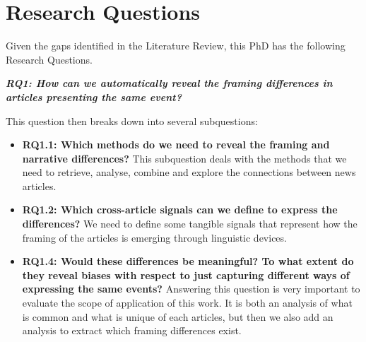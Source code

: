 \chapter{Research Questions}
\label{chap:research_questions}


Given the gaps identified in the Literature Review, this PhD has the following Research Questions.

\vspace{12px}

\textit{\textbf{RQ1: How can we automatically reveal the framing differences in articles presenting the same event?}}

\vspace{12px}

This question then breaks down into several subquestions:

\begin{itemize}
    \item \textbf{RQ1.1: Which methods do we need to reveal the framing and narrative differences?} This subquestion deals with the methods that we need to retrieve, analyse, combine and explore the connections between news articles. %
    
    \item \textbf{RQ1.2: Which cross-article signals can we define to express the differences?} We need to define some tangible signals that represent how the framing of the articles is emerging through linguistic devices. %
    
    
    \item \textbf{RQ1.4: Would these differences be meaningful? To what extent do they reveal biases with respect to just capturing different ways of expressing the same events?} Answering this question is very important to evaluate the scope of application of this work. It is both an analysis of what is common and what is unique of each articles, but then we also add an analysis to extract which framing differences exist. %
\end{itemize}


